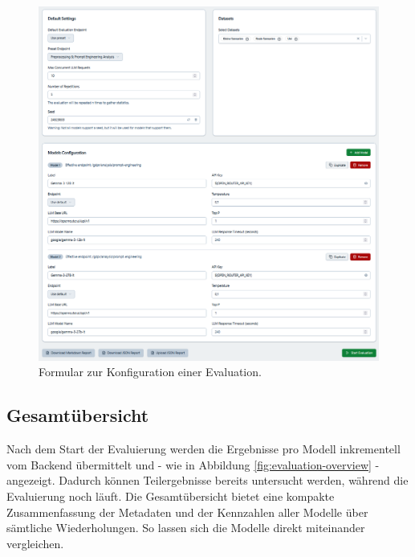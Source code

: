 \begin{figure}[h]
    \centering
    \includegraphics[width=\textwidth]{images/evaluation/evaluation-config_new}
    \caption{Formular zur Konfiguration einer Evaluation.}
    \label{fig:evaluation-config}
\end{figure}

\subsection*{Gesamtübersicht}

Nach dem Start der Evaluierung werden die Ergebnisse pro Modell inkrementell vom Backend übermittelt und - wie in Abbildung \ref{fig:evaluation-overview} - angezeigt. Dadurch können Teilergebnisse bereits untersucht werden, während die Evaluierung noch läuft. Die Gesamtübersicht bietet eine kompakte Zusammenfassung der Metadaten und der Kennzahlen aller Modelle über sämtliche Wiederholungen. So lassen sich die Modelle direkt miteinander vergleichen.

